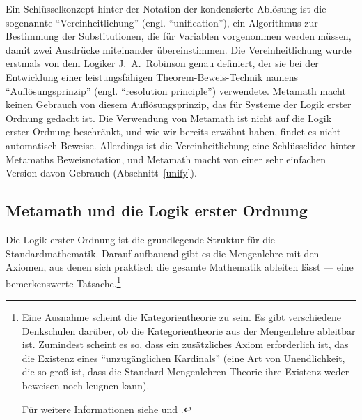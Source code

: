 Ein Schlüsselkonzept hinter der Notation der kondensierte Ablösung ist die sogenannte "`Vereinheitlichung"' (engl. "`unification"'), ein Algorithmus zur Bestimmung der Substitutionen, die für Variablen vorgenommen werden müssen, damit zwei Ausdrücke miteinander übereinstimmen.
Die Vereinheitlichung wurde erstmals von dem Logiker J.~A.~Robinson genau definiert, der sie bei der Entwicklung einer leistungsfähigen Theorem-Beweis-Technik namens "`Auflösungsprinzip"' (engl. "`resolution principle"') verwendete\cite{Robinson}. Metamath macht keinen Gebrauch von diesem Auflösungsprinzip, das für Systeme der Logik erster Ordnung gedacht ist.  Die Verwendung von Metamath ist nicht auf die Logik erster Ordnung beschränkt, und wie wir bereits erwähnt haben, findet es nicht automatisch Beweise.  Allerdings ist die Vereinheitlichung eine Schlüsselidee hinter Metamaths Beweisnotation, und Metamath macht von einer sehr einfachen Version davon Gebrauch (Abschnitt~\ref{unify}).

\subsection{Metamath und die Logik erster Ordnung}

Die Logik erster Ordnung ist die grundlegende Struktur für die Standardmathematik.  Darauf aufbauend gibt es die Mengenlehre mit den Axiomen, aus denen sich praktisch die gesamte Mathematik ableiten lässt --- eine bemerkenswerte Tatsache.\label{categoryth}\footnote{Eine Ausnahme scheint die Kategorientheorie zu sein.  Es gibt verschiedene Denkschulen darüber, ob die Kategorientheorie aus der Mengenlehre ableitbar ist.  Zumindest scheint es so, dass ein zusätzliches Axiom erforderlich ist, das die Existenz eines "`unzugänglichen Kardinals"' (eine Art von Unendlichkeit, die so groß ist, dass die Standard-Mengenlehren-Theorie ihre Existenz weder beweisen noch leugnen kann).

%
%
Für weitere Informationen siehe\cite[pp.~328--331]{Herrlich} und
\cite{Blass}.}

